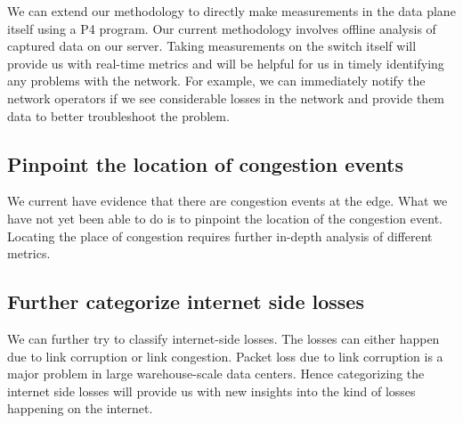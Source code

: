 We can extend our methodology to directly make measurements in the data plane itself using a P4 program. Our current methodology involves offline analysis of captured data on our server. Taking measurements on the switch itself will provide us with real-time metrics and will be helpful for us in timely identifying any problems with the network. For example, we can immediately notify the network operators if we see considerable losses in the network and provide them data to better troubleshoot the problem.

\subsection{Pinpoint the location of congestion events}

We current have evidence that there are congestion events at the edge. What we have not yet been able to do is to pinpoint the location of the congestion event. Locating the place of congestion requires further in-depth analysis of different metrics.

\subsection{Further categorize internet side losses}

We can further try to classify internet-side losses. The losses can either happen due to link corruption or link congestion. Packet loss due to link corruption is a major problem in large warehouse-scale data centers. Hence categorizing the internet side losses will provide us with new insights into the kind of losses happening on the internet.
